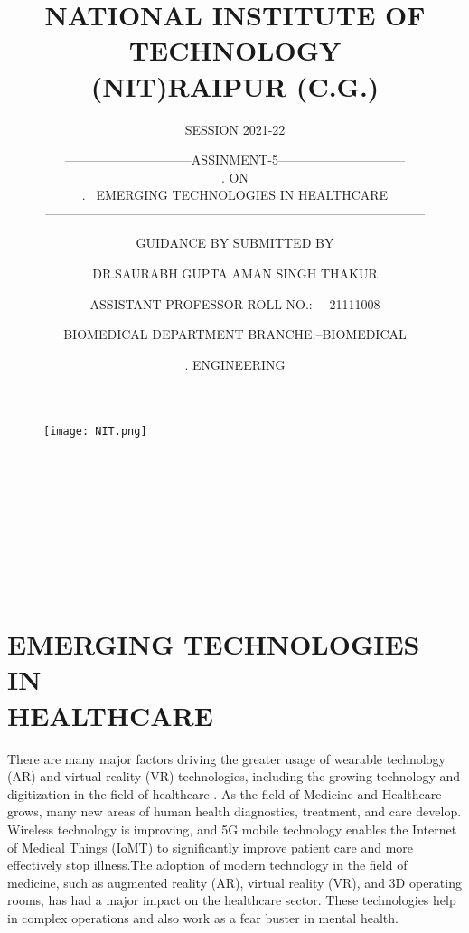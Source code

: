 \documentclass[12pt]{article}
\title{NATIONAL INSTITUTE OF TECHNOLOGY\\
(NIT)RAIPUR (C.G.)}
\author {SESSION 2021-22}
\date{}
\begin{document}
\maketitle
\begin{figure}[h]
\centering
\texttt{[image: NIT.png]}
\end{figure}
\author{------------------------------ASSINMENT-5------------------------------ \\
.\> \>\> \>\> \>\>\> \>\> \>\>\>\>\>\>  \>\> \>\>\> \>\> \>\> \> \>\> \>\> \>\> \>\> ON\\ 
.\> \>\> \>\> \>\ {EMERGING TECHNOLOGIES IN    HEALTHCARE}\\
------------------------------------------------------------------------------------------
 }\\


\author{GUIDANCE BY \> \>\> \>\> \>\>\> \>\> \>\>\>\>\>\>  \>\> \>\>\> \>\> \>\> \> \>\> \>\> \>\> \>\>  SUBMITTED BY }\\


\author{DR.SAURABH GUPTA\>  \>\> \>\> \>  \>\> \>\>\>\>\>  \>\> \>\>\>  \>\> \>\> \>  \>\> AMAN SINGH THAKUR }\\

\author{ ASSISTANT PROFESSOR\>  \>\> \>  \> \>   \>\> \>\> \> \>\> \> \>\> \>  ROLL NO.:--- 21111008 }\\
\author{BIOMEDICAL DEPARTMENT\>  \>\> \>\> \>  \>\> \>\> \>\>   \>\> BRANCHE:--BIOMEDICAL  }\\
\author{.\>   \>\> \>\> \>  \>\> \>\> \>\> \>\> \>\> \>  \>\> \>\> \>\>\>\> \>\> \>\>  \>\> \>\> \>\> \>\>\> \>\> \>   \>\> \>\> \>\> \>\>\> \>\> \>    \>\> \>\> \>\> \>\> \>\> \>  \>\> \>\> \>\>  \>\> ENGINEERING }
\clearpage
\tableofcontents
\clearpage
\section{EMERGING TECHNOLOGIES IN\\    HEALTHCARE }
There are many major factors driving the greater usage of wearable technology (AR) and virtual reality (VR) technologies, including the growing technology and digitization in the field of healthcare .  As the field of Medicine and Healthcare grows, many new areas of human health diagnostics, treatment, and care develop. Wireless technology is improving, and 5G mobile technology enables the Internet of Medical Things (IoMT) to significantly improve patient care and more effectively stop illness.The adoption of modern technology in the field of medicine, such as augmented reality (AR), virtual reality (VR), and 3D operating rooms, has had a major impact on the healthcare sector. These technologies help in complex operations and also work as a fear buster in mental health.\\
 
\end{document}
